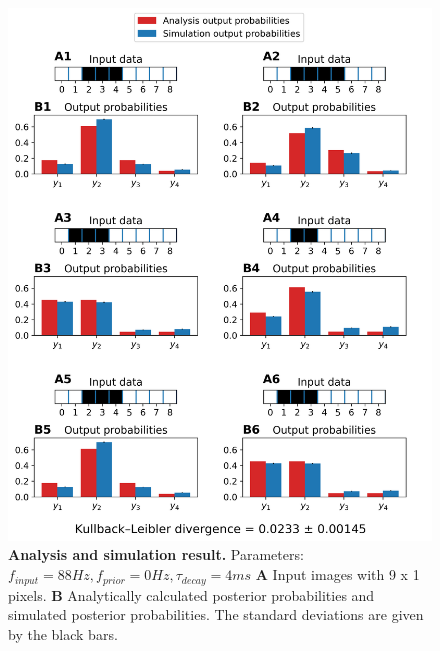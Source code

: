 \begin{figure}
  \includegraphics[width=\linewidth]{figures/1D/1D_88_0_4.png}
   \caption{\textbf{Analysis and simulation result. } Parameters: $f_{input} = 88 Hz, f_{prior} = 0 Hz, \tau_{decay} = 4 ms$ \textbf{A} Input images with 9 x 1 pixels. \textbf{B} Analytically calculated posterior probabilities and simulated posterior probabilities. The standard deviations are given by the black bars.}
  \label{fig:1D_88_0_4}
\end{figure}

